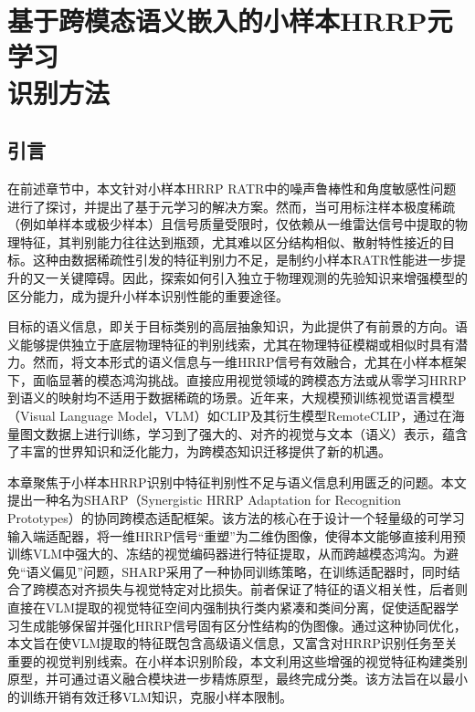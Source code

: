 \chapter[基于跨模态语义嵌入的小样本HRRP元学习识别方法]{基于跨模态语义嵌入的小样本HRRP元学习\protect\\ 识别方法}
\label{chap:semantic_fusion}

\section{引言}
\label{sec:semantic_intro}

在前述章节中，本文针对小样本HRRP RATR中的噪声鲁棒性和角度敏感性问题进行了探讨，并提出了基于元学习的解决方案。然而，当可用标注样本极度稀疏（例如单样本或极少样本）且信号质量受限时，仅依赖从一维雷达信号中提取的物理特征，其判别能力往往达到瓶颈，尤其难以区分结构相似、散射特性接近的目标。这种由数据稀疏性引发的特征判别力不足，是制约小样本RATR性能进一步提升的又一关键障碍。因此，探索如何引入独立于物理观测的先验知识来增强模型的区分能力，成为提升小样本识别性能的重要途径。

目标的语义信息，即关于目标类别的高层抽象知识，为此提供了有前景的方向。语义能够提供独立于底层物理特征的判别线索，尤其在物理特征模糊或相似时具有潜力。然而，将文本形式的语义信息与一维HRRP信号有效融合，尤其在小样本框架下，面临显著的模态鸿沟挑战。直接应用视觉领域的跨模态方法或从零学习HRRP到语义的映射均不适用于数据稀疏的场景。近年来，大规模预训练视觉语言模型（Visual Language Model，VLM）如CLIP及其衍生模型RemoteCLIP，通过在海量图文数据上进行训练，学习到了强大的、对齐的视觉与文本（语义）表示，蕴含了丰富的世界知识和泛化能力，为跨模态知识迁移提供了新的机遇。

本章聚焦于小样本HRRP识别中特征判别性不足与语义信息利用匮乏的问题。本文提出一种名为SHARP（Synergistic HRRP Adaptation for Recognition Prototypes）的协同跨模态适配框架。该方法的核心在于设计一个轻量级的可学习输入端适配器，将一维HRRP信号“重塑”为二维伪图像，使得本文能够直接利用预训练VLM中强大的、冻结的视觉编码器进行特征提取，从而跨越模态鸿沟。为避免“语义偏见”问题，SHARP采用了一种协同训练策略，在训练适配器时，同时结合了跨模态对齐损失与视觉特定对比损失。前者保证了特征的语义相关性，后者则直接在VLM提取的视觉特征空间内强制执行类内紧凑和类间分离，促使适配器学习生成能够保留并强化HRRP信号固有区分性结构的伪图像。通过这种协同优化，本文旨在使VLM提取的特征既包含高级语义信息，又富含对HRRP识别任务至关重要的视觉判别线索。在小样本识别阶段，本文利用这些增强的视觉特征构建类别原型，并可通过语义融合模块进一步精炼原型，最终完成分类。该方法旨在以最小的训练开销有效迁移VLM知识，克服小样本限制。

